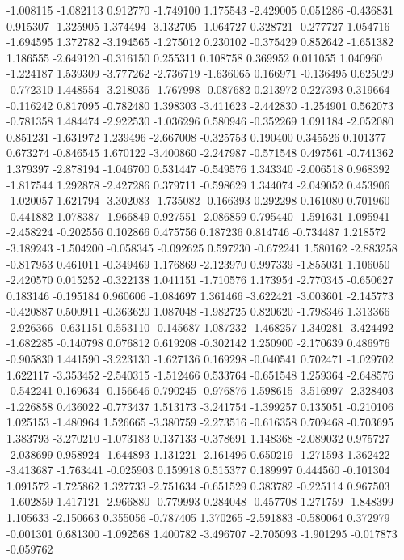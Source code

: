 -1.008115
-1.082113
0.912770
-1.749100
1.175543
-2.429005
0.051286
-0.436831
0.915307
-1.325905
1.374494
-3.132705
-1.064727
0.328721
-0.277727
1.054716
-1.694595
1.372782
-3.194565
-1.275012
0.230102
-0.375429
0.852642
-1.651382
1.186555
-2.649120
-0.316150
0.255311
0.108758
0.369952
0.011055
1.040960
-1.224187
1.539309
-3.777262
-2.736719
-1.636065
0.166971
-0.136495
0.625029
-0.772310
1.448554
-3.218036
-1.767998
-0.087682
0.213972
0.227393
0.319664
-0.116242
0.817095
-0.782480
1.398303
-3.411623
-2.442830
-1.254901
0.562073
-0.781358
1.484474
-2.922530
-1.036296
0.580946
-0.352269
1.091184
-2.052080
0.851231
-1.631972
1.239496
-2.667008
-0.325753
0.190400
0.345526
0.101377
0.673274
-0.846545
1.670122
-3.400860
-2.247987
-0.571548
0.497561
-0.741362
1.379397
-2.878194
-1.046700
0.531447
-0.549576
1.343340
-2.006518
0.968392
-1.817544
1.292878
-2.427286
0.379711
-0.598629
1.344074
-2.049052
0.453906
-1.020057
1.621794
-3.302083
-1.735082
-0.166393
0.292298
0.161080
0.701960
-0.441882
1.078387
-1.966849
0.927551
-2.086859
0.795440
-1.591631
1.095941
-2.458224
-0.202556
0.102866
0.475756
0.187236
0.814746
-0.734487
1.218572
-3.189243
-1.504200
-0.058345
-0.092625
0.597230
-0.672241
1.580162
-2.883258
-0.817953
0.461011
-0.349469
1.176869
-2.123970
0.997339
-1.855031
1.106050
-2.420570
0.015252
-0.322138
1.041151
-1.710576
1.173954
-2.770345
-0.650627
0.183146
-0.195184
0.960606
-1.084697
1.361466
-3.622421
-3.003601
-2.145773
-0.420887
0.500911
-0.363620
1.087048
-1.982725
0.820620
-1.798346
1.313366
-2.926366
-0.631151
0.553110
-0.145687
1.087232
-1.468257
1.340281
-3.424492
-1.682285
-0.140798
0.076812
0.619208
-0.302142
1.250900
-2.170639
0.486976
-0.905830
1.441590
-3.223130
-1.627136
0.169298
-0.040541
0.702471
-1.029702
1.622117
-3.353452
-2.540315
-1.512466
0.533764
-0.651548
1.259364
-2.648576
-0.542241
0.169634
-0.156646
0.790245
-0.976876
1.598615
-3.516997
-2.328403
-1.226858
0.436022
-0.773437
1.513173
-3.241754
-1.399257
0.135051
-0.210106
1.025153
-1.480964
1.526665
-3.380759
-2.273516
-0.616358
0.709468
-0.703695
1.383793
-3.270210
-1.073183
0.137133
-0.378691
1.148368
-2.089032
0.975727
-2.038699
0.958924
-1.644893
1.131221
-2.161496
0.650219
-1.271593
1.362422
-3.413687
-1.763441
-0.025903
0.159918
0.515377
0.189997
0.444560
-0.101304
1.091572
-1.725862
1.327733
-2.751634
-0.651529
0.383782
-0.225114
0.967503
-1.602859
1.417121
-2.966880
-0.779993
0.284048
-0.457708
1.271759
-1.848399
1.105633
-2.150663
0.355056
-0.787405
1.370265
-2.591883
-0.580064
0.372979
-0.001301
0.681300
-1.092568
1.400782
-3.496707
-2.705093
-1.901295
-0.017873
-0.059762
